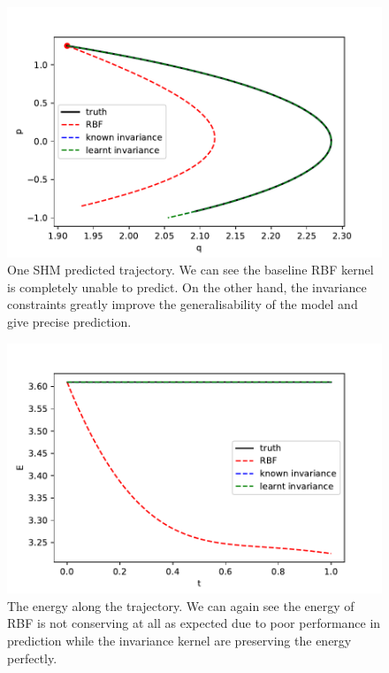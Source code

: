 \documentclass{statsmsc}
\begin{document}
\begin{figure}[H]
        \centering
        \includegraphics[width=0.8\linewidth]{../codes/figures/shm_predicted.pdf}
        \caption{One SHM predicted trajectory. We can see the baseline RBF kernel is completely unable to predict. On the other hand, the invariance constraints greatly improve the generalisability of the model and give precise prediction.}
        \label{fig:shm_prediction}
\end{figure}

\begin{figure}[H] 
  \includegraphics[width=0.8\linewidth]{../codes/figures/shm_energy.pdf}
  \centering
  \caption{The energy along the trajectory. We can again see the energy of RBF is not conserving at all as expected due to poor performance in prediction while the invariance kernel are preserving the energy perfectly.}
  \label{fig:shm_energy}
\end{figure}
\end{document}
